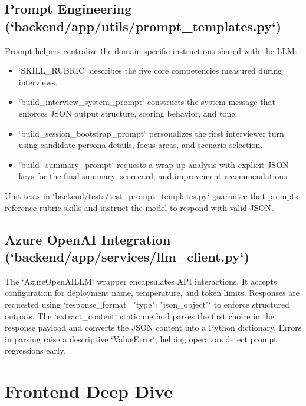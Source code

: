 \documentclass[11pt]{article}
\begin{document}
\subsection{Prompt Engineering (`backend/app/utils/prompt_templates.py`)}
Prompt helpers centralize the domain-specific instructions shared with the LLM:
\begin{itemize}[leftmargin=*]
  \item `SKILL_RUBRIC` describes the five core competencies measured during interviews.
  \item `build_interview_system_prompt` constructs the system message that enforces JSON output structure, scoring behavior, and tone.
  \item `build_session_bootstrap_prompt` personalizes the first interviewer turn using candidate persona details, focus areas, and scenario selection.
  \item `build_summary_prompt` requests a wrap-up analysis with explicit JSON keys for the final summary, scorecard, and improvement recommendations.
\end{itemize}
Unit tests in `backend/tests/test_prompt_templates.py` guarantee that prompts reference rubric skills and instruct the model to respond with valid JSON.

\subsection{Azure OpenAI Integration (`backend/app/services/llm_client.py`)}
The `AzureOpenAILLM` wrapper encapsulates API interactions. It accepts configuration for deployment name, temperature, and token limits. Responses are requested using `response_format={"type": "json_object"}` to enforce structured outputs. The `extract_content` static method parses the first choice in the response payload and converts the JSON content into a Python dictionary. Errors in parsing raise a descriptive `ValueError`, helping operators detect prompt regressions early.

\section{Frontend Deep Dive}
\end{document}
